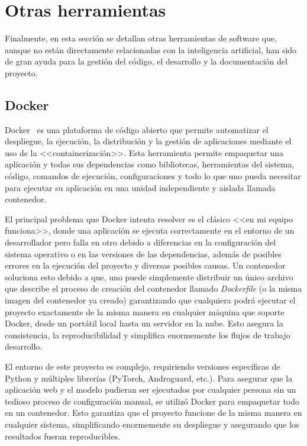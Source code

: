 \section{Otras herramientas}

Finalmente, en esta sección se detallan otras herramientas de software que, aunque no están directamente relacionadas con la inteligencia artificial, han sido de gran ayuda para la gestión del código, el desarrollo y la documentación del proyecto.

\subsection{Docker}


Docker~\cite{dockerDocs} es una plataforma de código abierto que permite automatizar el despliegue, la ejecución, la distribución y la gestión de aplicaciones mediante el uso de la <<containerización>>. Esta herramienta permite empaquetar una aplicación y todas sus dependencias como bibliotecas, herramientas del sistema, código, comandos de ejecución, configuraciones y todo lo que uno pueda necesitar para ejecutar su aplicación en una unidad independiente y aislada llamada contenedor.

El principal problema que Docker intenta resolver es el clásico <<en mi equipo funciona>>, donde una aplicación se ejecuta correctamente en el entorno de un desarrollador pero falla en otro debido a diferencias en la configuración del sistema operativo o en las versiones de las dependencias, además de posibles errores en la ejecución del proyecto y diversas posibles causas. Un contenedor soluciona esto debido a que, uno puede simplemente distribuir un único archivo que describe el proceso de creación del contenedor llamado \textit{Dockerfile} (o la misma imagen del contenedor ya creado) garantizando que cualquiera podrá ejecutar el proyecto exactamente de la misma manera en cualquier máquina que soporte Docker, desde un portátil local hasta un servidor en la nube. Esto asegura la consistencia, la reproducibilidad y simplifica enormemente los flujos de trabajo desarrollo.

El entorno de este proyecto es complejo, requiriendo versiones específicas de Python y múltiples librerías (PyTorch, Androguard, etc.). Para asegurar que la aplicación web y el modelo pudieran ser ejecutados por cualquier persona sin un tedioso proceso de configuración manual, se utilizó Docker para empaquetar todo en un contenedor. Esto garantiza que el proyecto funcione de la misma manera en cualquier sistema, simplificando enormemente su despliegue y asegurando que los resultados fueran reproducibles.

